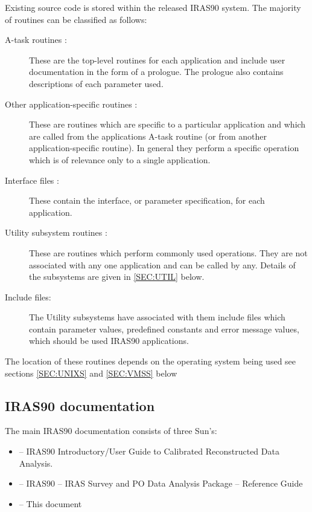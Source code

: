 \documentclass[twoside,11pt,nolof]{starlink}
\begin{document}
Existing source code is stored within the released {\small IRAS90} system.
The majority of routines can be classified as follows:

\begin{description}

\item [A-task routines :] These are the top-level routines for each
application and include user documentation in the form of a prologue.
The prologue also contains descriptions of each parameter used.

\item [Other application-specific routines :] These are routines which
are specific to a particular application and which are called from the
applications A-task routine (or from another application-specific
routine). In general they perform a specific operation which is of
relevance only to a single application.

\item [Interface files :] These contain the interface, or parameter
specification, for each application.

\item [Utility subsystem routines :] These are routines which perform commonly
used operations. They are not associated with any one application and
can be called by any. Details of the subsystems are given in \ref{SEC:UTIL}
below.

\item [Include files:] The Utility subsystems have associated with them include
files which contain parameter values, predefined constants and error message
values, which should be used {\small IRAS90} applications.

\end{description}

The location of these routines depends on the operating system being
used see sections \ref{SEC:UNIXS} and \ref{SEC:VMSS} below

\subsection{IRAS90 documentation}

The main {\small IRAS90} documentation consists of three Sun's:

\begin{itemize}

\item {} --
IRAS90 Introductory/User Guide to Calibrated Reconstructed Data Analysis.

\item {} --
IRAS90 -- IRAS Survey and PO Data Analysis Package -- Reference Guide

\item {} -- This document

\end{itemize}
\end{document}
